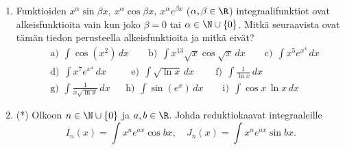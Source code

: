 \begin{enumerate}
\item
Funktioiden $x^\alpha\sin\beta x,\ x^\alpha\cos\beta x,\ x^\alpha e^{\beta x}$
($\alpha,\beta\in\R$) integraalifunktiot ovat alkeisfunktioita vain kun joko $\beta=0$ tai 
$\alpha\in\N\cup\{0\}$. Mitkä seuraavista ovat tämän tiedon perusteella alkeisfunktioita ja 
mitkä eivät?
\begin{align*}
&\text{a)}\ \ \int \cos(x^2)\,dx \qquad
 \text{b)}\ \ \int x^{13}\sqrt{x}\cos\sqrt{x}\,dx \qquad
 \text{c)}\ \ \int x^5 e^{x^4}\,dx \\
&\text{d)}\ \ \int x^7 e^{x^4}\,dx \qquad\,\ \
 \text{e)}\ \ \int \sqrt{\ln x}\,dx \qquad\
 \text{f)}\ \ \int \frac{1}{\ln x}\,dx \\
&\text{g)}\ \ \int \frac{1}{x\sqrt{\ln x}}\,dx \quad\,\ \ 
 \text{h)}\ \ \int \sin(e^x)\,dx \qquad
 \text{i)}\ \ \int \cos x\,\ln x\,dx
\end{align*}

\item (*)
Olkoon $n\in\N\cup\{0\}$ ja $a,b\in\R$. Johda reduktiokaavat integraaleille
\[
I_n(x)=\int x^n e^{ax}\cos bx, \quad J_n(x)=\int x^n e^{ax}\sin bx.
\]

\end{enumerate}